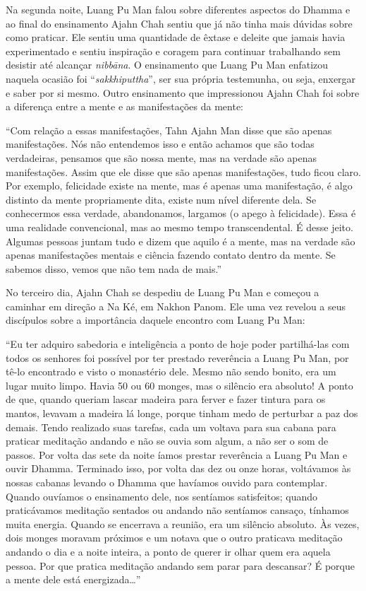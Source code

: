 Na segunda noite, Luang Pu Man falou sobre diferentes aspectos do Dhamma
e ao final do ensinamento Ajahn Chah sentiu que já não tinha mais
dúvidas sobre como praticar. Ele sentiu uma quantidade de êxtase e
deleite que jamais havia experimentado e sentiu inspiração e coragem
para continuar trabalhando sem desistir até alcançar \emph{nibbāna}. O
ensinamento que Luang Pu Man enfatizou naquela ocasião foi
``\emph{sakkhiputtha}'', ser sua própria testemunha, ou seja, enxergar e
saber por si mesmo. Outro ensinamento que impressionou Ajahn Chah foi
sobre a diferença entre a mente e as manifestações da mente:

``Com relação a essas manifestações, Tahn Ajahn Man disse que são apenas
manifestações. Nós não entendemos isso e então achamos que são todas
verdadeiras, pensamos que são nossa mente, mas na verdade são apenas
manifestações. Assim que ele disse que são apenas manifestações, tudo
ficou claro. Por exemplo, felicidade existe na mente, mas é apenas uma
manifestação, é algo distinto da mente propriamente dita, existe num
nível diferente dela. Se conhecermos essa verdade, abandonamos, largamos
(o apego à felicidade). Essa é uma realidade convencional, mas ao mesmo
tempo transcendental. É desse jeito. Algumas pessoas juntam tudo e dizem
que aquilo é a mente, mas na verdade são apenas manifestações mentais e
ciência fazendo contato dentro da mente. Se sabemos disso, vemos que não
tem nada de mais.''

No terceiro dia, Ajahn Chah se despediu de Luang Pu Man e começou a
caminhar em direção a Na Ké, em Nakhon Panom. Ele uma vez revelou a seus
discípulos sobre a importância daquele encontro com Luang Pu Man:

``Eu ter adquiro sabedoria e inteligência a ponto de hoje poder
partilhá-las com todos os senhores foi possível por ter prestado
reverência a Luang Pu Man, por tê-lo encontrado e visto o monastério
dele. Mesmo não sendo bonito, era um lugar muito limpo. Havia 50 ou 60
monges, mas o silêncio era absoluto! A ponto de que, quando queriam
lascar madeira para ferver e fazer tintura para os mantos, levavam a
madeira lá longe, porque tinham medo de perturbar a paz dos demais.
Tendo realizado suas tarefas, cada um voltava para sua cabana para
praticar meditação andando e não se ouvia som algum, a não ser o som de
passos. Por volta das sete da noite íamos prestar reverência a Luang Pu
Man e ouvir Dhamma. Terminado isso, por volta das dez ou onze horas,
voltávamos às nossas cabanas levando o Dhamma que havíamos ouvido para
contemplar. Quando ouvíamos o ensinamento dele, nos sentíamos
satisfeitos; quando praticávamos meditação sentados ou andando não
sentíamos cansaço, tínhamos muita energia. Quando se encerrava a
reunião, era um silêncio absoluto. Às vezes, dois monges moravam
próximos e um notava que o outro praticava meditação andando o dia e a
noite inteira, a ponto de querer ir olhar quem era aquela pessoa. Por
que pratica meditação andando sem parar para descansar? É porque a mente
dele está energizada\ldots{}''

